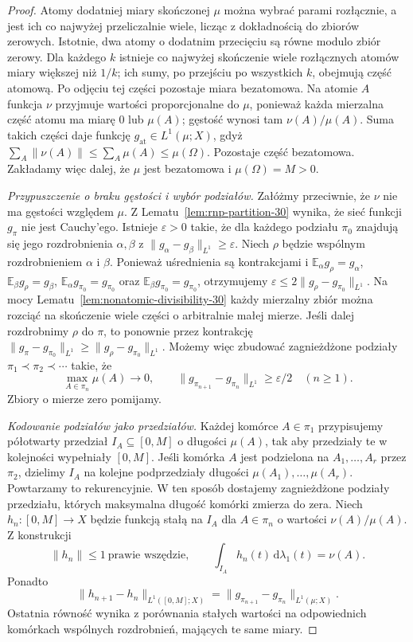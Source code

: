 \begin{proof}
Atomy dodatniej miary skończonej $\mu$ można
wybrać parami rozłącznie, a jest ich co najwyżej
przeliczalnie wiele, licząc z dokładnością do zbiorów
zerowych. Istotnie, dwa atomy o dodatnim przecięciu
są równe modulo zbiór zerowy. Dla każdego $k$
istnieje co najwyżej skończenie wiele rozłącznych
atomów miary większej niż $1/k$; ich sumy, po
przejściu po wszystkich $k$, obejmują część atomową.
Po odjęciu tej części pozostaje miara bezatomowa.
Na atomie $A$ funkcja
$\nu$ przyjmuje wartości proporcjonalne do $\mu$,
ponieważ każda mierzalna część atomu ma miarę $0$
lub $\mu(A)$; gęstość wynosi tam
$\nu(A)/\mu(A)$. Suma takich części daje funkcję
$g_{\mathrm{at}}\in L^1(\mu;X)$, gdyż
$\sum_A\|\nu(A)\|\le\sum_A\mu(A)\le\mu(\Omega)$.
Pozostaje część bezatomowa. Zakładamy więc dalej,
że $\mu$ jest bezatomowa i $\mu(\Omega)=M>0$.

\emph{Przypuszczenie o braku gęstości i wybór podziałów.}
Załóżmy przeciwnie, że $\nu$ nie ma gęstości
względem $\mu$. Z Lematu~\ref{lem:rnp-partition-30}
wynika, że sieć funkcji $g_\pi$ nie jest Cauchy'ego.
Istnieje $\varepsilon>0$ takie, że dla każdego
podziału $\pi_0$ znajdują się jego rozdrobnienia
$\alpha,\beta$ z
$\|g_\alpha-g_\beta\|_{L^1}\ge\varepsilon$.
Niech $\rho$ będzie wspólnym rozdrobnieniem
$\alpha$ i $\beta$. Ponieważ uśrednienia są
kontrakcjami i $\mathbb E_\alpha g_\rho=g_\alpha$,
$\mathbb E_\beta g_\rho=g_\beta$,
$\mathbb E_\alpha g_{\pi_0}=g_{\pi_0}$ oraz
$\mathbb E_\beta g_{\pi_0}=g_{\pi_0}$,
otrzymujemy
$\varepsilon\le2\|g_\rho-g_{\pi_0}\|_{L^1}$.
Na mocy Lematu~\ref{lem:nonatomic-divisibility-30}
każdy mierzalny zbiór można rozciąć na skończenie
wiele części o arbitralnie małej mierze. Jeśli dalej rozdrobnimy
$\rho$ do $\pi$, to ponownie przez kontrakcję
$\|g_\pi-g_{\pi_0}\|_{L^1}
\ge\|g_\rho-g_{\pi_0}\|_{L^1}$.
Możemy więc zbudować zagnieżdżone podziały
$\pi_1\prec\pi_2\prec\cdots$ takie, że
\begin{equation}\label{eq:rnp-partition-jumps-30}
 \max_{A\in\pi_n}\mu(A)\longrightarrow0,
 \qquad
 \|g_{\pi_{n+1}}-g_{\pi_n}\|_{L^1}
 \ge\varepsilon/2\quad(n\ge1).
\end{equation}
Zbiory o mierze zero pomijamy.

\emph{Kodowanie podziałów jako przedziałów.}
Każdej komórce $A\in\pi_1$ przypisujemy
półotwarty przedział $I_A\subseteq[0,M]$ o
długości $\mu(A)$, tak aby przedziały te
w kolejności wypełniały $[0,M]$.
Jeśli komórka $A$ jest podzielona na
$A_1,\ldots,A_r$ przez $\pi_2$, dzielimy
$I_A$ na kolejne podprzedziały długości
$\mu(A_1),\ldots,\mu(A_r)$. Powtarzamy to
rekurencyjnie. W ten sposób dostajemy zagnieżdżone
podziały przedziału, których maksymalna długość
komórki zmierza do zera. Niech $h_n:[0,M]\to X$
będzie funkcją stałą na $I_A$ dla $A\in\pi_n$
o wartości $\nu(A)/\mu(A)$. Z konstrukcji
\[
 \|h_n\|\le1\ \text{prawie wszędzie},\qquad
 \int_{I_A}h_n(t)\,\mathrm d\lambda_1(t)=\nu(A).
\]
Ponadto
\[
 \|h_{n+1}-h_n\|_{L^1([0,M];X)}
 =\|g_{\pi_{n+1}}-g_{\pi_n}\|_{L^1(\mu;X)}.
\]
Ostatnia równość wynika z porównania stałych
wartości na odpowiednich komórkach wspólnych
rozdrobnień, mających te same miary.


\end{proof}
